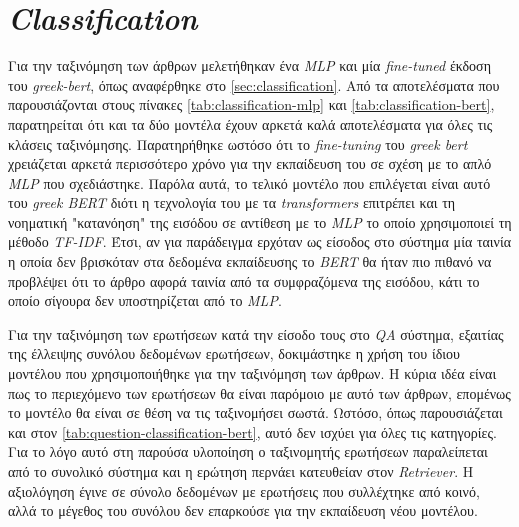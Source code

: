 \section{\emph{Classification}}
\label{sec:classification_exp}
Για την ταξινόμηση των άρθρων μελετήθηκαν ένα \emph{MLP} και μία \emph{fine-tuned} έκδοση του \emph{greek-bert}, όπως αναφέρθηκε στο \autoref{sec:classification}. Από τα αποτελέσματα που παρουσιάζονται στους πίνακες \ref{tab:classification-mlp} και \ref{tab:classification-bert}, παρατηρείται ότι και τα δύο μοντέλα έχουν αρκετά καλά αποτελέσματα για όλες τις κλάσεις ταξινόμησης. Παρατηρήθηκε ωστόσο ότι το \emph{fine-tuning} του \emph{greek bert} χρειάζεται αρκετά περισσότερο χρόνο για την εκπαίδευση του σε σχέση με το απλό \emph{MLP} που σχεδιάστηκε. Παρόλα αυτά, το τελικό μοντέλο που επιλέγεται είναι αυτό του \emph{greek BERT} διότι η τεχνολογία του με τα \emph{transformers} επιτρέπει και τη νοηματική "κατανόηση" της εισόδου σε αντίθεση με το \emph{MLP} το οποίο χρησιμοποιεί τη μέθοδο \emph{TF-IDF}. Έτσι, αν για παράδειγμα ερχόταν ως είσοδος στο σύστημα μία ταινία η οποία δεν βρισκόταν στα δεδομένα εκπαίδευσης το \emph{BERT} θα ήταν πιο πιθανό να προβλέψει ότι το άρθρο αφορά ταινία από τα συμφραζόμενα της εισόδου, κάτι το οποίο σίγουρα δεν υποστηρίζεται από το \emph{MLP}.






Για την ταξινόμηση των ερωτήσεων κατά την είσοδο τους στο \emph{QA} σύστημα, εξαιτίας της έλλειψης συνόλου δεδομένων ερωτήσεων, δοκιμάστηκε η χρήση του ίδιου μοντέλου που χρησιμοποιήθηκε για την ταξινόμηση των άρθρων. Η κύρια ιδέα είναι πως το περιεχόμενο των ερωτήσεων θα είναι παρόμοιο με αυτό των άρθρων, επομένως το μοντέλο θα είναι σε θέση να τις ταξινομήσει σωστά. Ωστόσο, όπως παρουσιάζεται και στον \autoref{tab:question-classification-bert}, αυτό δεν ισχύει για όλες τις κατηγορίες. Για το λόγο αυτό στη παρούσα υλοποίηση ο ταξινομητής ερωτήσεων παραλείπεται από το συνολικό σύστημα και η ερώτηση περνάει κατευθείαν στον \emph{Retriever}. Η αξιολόγηση έγινε σε σύνολο δεδομένων με ερωτήσεις που συλλέχτηκε από κοινό, αλλά το μέγεθος του συνόλου δεν επαρκούσε για την εκπαίδευση νέου μοντέλου.

